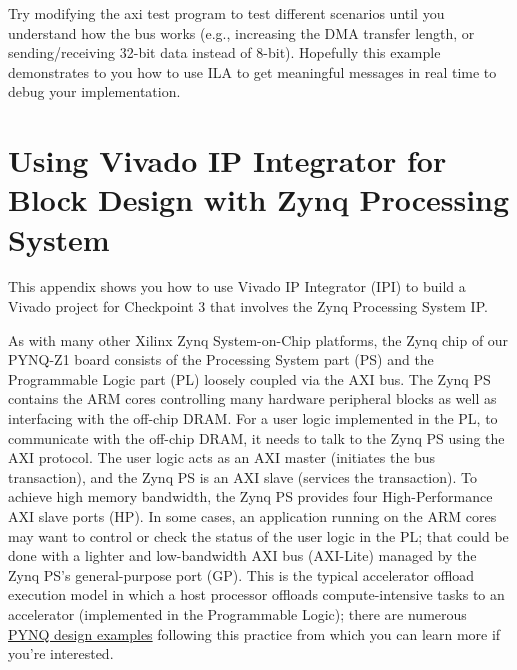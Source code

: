 \documentclass[11pt]{article}
\begin{document}
\begin{appendices}
Try modifying the axi test program to test different scenarios until you understand how the bus works (e.g., increasing the DMA transfer length, or sending/receiving 32-bit data instead of 8-bit). Hopefully this example demonstrates to you how to use ILA to get meaningful messages in real time to debug your implementation.

\pagebreak
\section{Using Vivado IP Integrator for Block Design with Zynq Processing System}
\label{sec:vivado_bd}

This appendix shows you how to use Vivado IP Integrator (IPI) to build a Vivado project for Checkpoint 3 that involves the Zynq Processing System IP.

As with many other Xilinx Zynq System-on-Chip platforms, the Zynq chip of our PYNQ-Z1 board consists of the Processing System part (PS) and the Programmable Logic part (PL) loosely coupled via the AXI bus. The Zynq PS contains the ARM cores controlling many hardware peripheral blocks as well as interfacing with the off-chip DRAM. For a user logic implemented in the PL, to communicate with the off-chip DRAM, it needs to talk to the Zynq PS using the AXI protocol. The user logic acts as an AXI master (initiates the bus transaction), and the Zynq PS is an AXI slave (services the transaction). To achieve high memory bandwidth, the Zynq PS provides four High-Performance AXI slave ports (HP). In some cases, an application running on the ARM cores may want to control or check the status of the user logic in the PL; that could be done with a lighter and low-bandwidth AXI bus (AXI-Lite) managed by the Zynq PS's general-purpose port (GP). This is the typical accelerator offload execution model in which a host processor offloads compute-intensive tasks to an accelerator (implemented in the Programmable Logic); there are numerous \href{http://www.pynq.io/examples}{PYNQ design examples} following this practice from which you can learn more if you're interested.

\begin{center}
\end{center}


\end{appendices}
\end{document}
